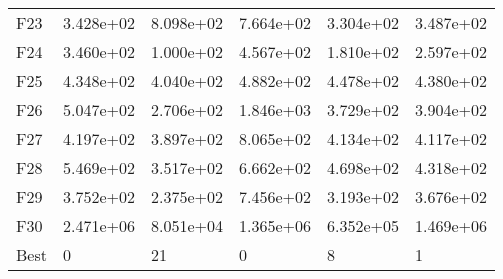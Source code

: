 \begin{tabular}{llllll}
F23  &  3.428e+02 &  8.098e+02 &  7.664e+02 &  3.304e+02 &  3.487e+02 \\
F24  &  3.460e+02 &  1.000e+02 &  4.567e+02 &  1.810e+02 &  2.597e+02 \\
F25  &  4.348e+02 &  4.040e+02 &  4.882e+02 &  4.478e+02 &  4.380e+02 \\
F26  &  5.047e+02 &  2.706e+02 &  1.846e+03 &  3.729e+02 &  3.904e+02 \\
F27  &  4.197e+02 &  3.897e+02 &  8.065e+02 &  4.134e+02 &  4.117e+02 \\
F28  &  5.469e+02 &  3.517e+02 &  6.662e+02 &  4.698e+02 &  4.318e+02 \\
F29  &  3.752e+02 &  2.375e+02 &  7.456e+02 &  3.193e+02 &  3.676e+02 \\
F30  &  2.471e+06 &  8.051e+04 &  1.365e+06 &  6.352e+05 &  1.469e+06 \\
Best &          0 &         21 &          0 &          8 &          1 \\
\bottomrule
\end{tabular}
